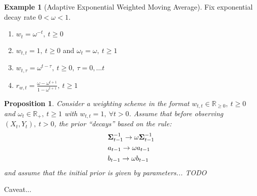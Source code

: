 \documentclass[10pt,fleqn]{amsart}
\newtheorem{proposition}[theorem]{Proposition}
\theoremstyle{definition}
\newtheorem{example}[theorem]{Example}
\theoremstyle{remark}
\numberwithin{equation}{section}
\newcommand{\RR}{\mathbb{R}}
\newcommand{\SSigma}{\boldsymbol{\Sigma}}
\begin{document}
\begin{example}[Adaptive Exponential Weighted Moving Average] Fix exponential decay rate $0<\omega<1$.
    \begin{enumerate}
        \item $\displaystyle w_t=\omega^{-t},\ t\geq 0$
        \item $\displaystyle w_{t,t}=1,\ t\geq 0$ and $\omega_t=\omega,\ t\geq 1$
        \item $\displaystyle w_{t,\tau}=\omega^{t-\tau},\ t\geq 0,\ \tau=0,\ldots t$
        \item $\displaystyle r_{w,t}=\frac{\omega-\omega^{t+1}}{1-\omega^{t+1}},\ t\geq 1$
    \end{enumerate}
\end{example}
\begin{proposition}
    Consider a weighting scheme in the format $w_{t,t}\in\RR_{\geq 0},\ t\geq 0$ and $\omega_t\in \RR_+,\ t\geq 1$
    with $w_{t,t}=1,\ \forall t>0$.
    Assume that before observing $(X_t, Y_t),\ t>0$, the prior ``decays'' based on the rule:
    \begin{align}\displaystyle
        &\SSigma_{t-1}^{-1}\rightarrow \omega\SSigma_{t-1}^{-1}\\
        &a_{t-1}\rightarrow \omega a_{t-1}\\
        &b_{t-1}\rightarrow \omega b_{t-1}
    \end{align}
    and assume that the initial prior is given by parameters... TODO
\end{proposition}
Caveat... 
\end{document}
